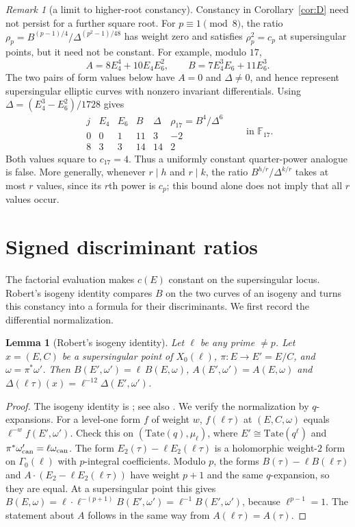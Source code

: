 \documentclass[11pt,a4paper]{article}
\numberwithin{equation}{section}
\newtheorem{lemma}[theorem]{Lemma}
\theoremstyle{definition}
\theoremstyle{remark}
\newtheorem{remark}[theorem]{Remark}
\begin{document}
\begin{remark}[a limit to higher-root constancy]\label{rem:higher-roots}
Constancy in Corollary~\ref{cor:D} need not persist for a further
square root. For $p\equiv1\pmod8$, the ratio
$\rho_p=B^{(p-1)/4}/\Delta^{(p^2-1)/48}$ has weight zero and satisfies
$\rho_p^2=c_p$ at supersingular points, but it need not be constant.
For example, modulo $17$,
\[
A=8E_4^4+10E_4E_6^2,\qquad B=7E_4^3E_6+11E_6^3.
\]
The two pairs of form values below have $A=0$ and $\Delta\ne0$, and
hence represent supersingular elliptic curves with nonzero
invariant differentials. Using $\Delta=(E_4^3-E_6^2)/1728$ gives
\[
\begin{array}{c|cc|cc|c}
j&E_4&E_6&B&\Delta&\rho_{17}=B^4/\Delta^6\\\hline
0&0&1&11&3&-2\\
8&3&3&14&14&2
\end{array}
\qquad\text{in }\mathbb F_{17}.
\]
Both values square to $c_{17}=4$. Thus a uniformly constant
quarter-power analogue is false. More generally, whenever
$r\mid h$ and $r\mid k$, the ratio $B^{h/r}/\Delta^{k/r}$ takes at
most $r$ values, since its $r$th power is $c_p$; this bound alone
does not imply that all $r$ values occur.
\end{remark}

\section{Signed discriminant ratios}\label{sec:proof}
The factorial evaluation makes $c(E)$ constant on the supersingular
locus. Robert's isogeny identity compares $B$ on the two curves of an
isogeny and turns this constancy into a formula for their discriminants.
We first record the differential normalization.
\begin{lemma}[Robert's isogeny identity]\label{lem:Bisog}
Let $\ell $ be any prime $\ne p$. Let $x=(E,C)$ be a supersingular point of
$X_0(\ell )$, $\pi:E\to E'=E/C$, and $\omega=\pi^*\omega'$. Then
$B(E',\omega')=\ell \,B(E,\omega)$, $A(E',\omega')=A(E,\omega)$ and
$\Delta(\ell \tau)(x)=\ell ^{-12}\Delta(E',\omega')$.
\end{lemma}
\begin{proof}
The isogeny identity is \citet[Th\'eor\`eme B; \S3.3, Lemma~7]{Robert80}; see also
\citet[Lemma~2.2]{Baker98}. We verify the normalization by $q$-expansions.
For a level-one form $f$ of weight $w$, $f(\ell \tau)$ at $(E,C,\omega)$ equals $\ell ^{-w}f(E',\omega')$. Check
this on $(\mathrm{Tate}(q),\mu_\ell )$, where $E'\cong\mathrm{Tate}(q^\ell )$ and
$\pi^*\omega_{\rm can}'=\ell \omega_{\rm can}$. The form $E_2(\tau)-\ell E_2(\ell \tau)$ is a holomorphic
weight-$2$ form on $\Gamma_0(\ell )$ with $p$-integral coefficients. Modulo $p$, the forms
$B(\tau)-\ell B(\ell \tau)$ and $A\cdot(E_2-\ell E_2(\ell \tau))$ have weight $p+1$ and the same $q$-expansion, so they
are equal. At a supersingular point this gives $B(E,\omega)=\ell \cdot \ell ^{-(p+1)}B(E',\omega')=\ell ^{-1}B(E',\omega')$,
because $\ell ^{p-1}=1$. The statement about $A$ follows in the same way from $A(\ell \tau)=A(\tau)$.
\end{proof}
\end{document}
